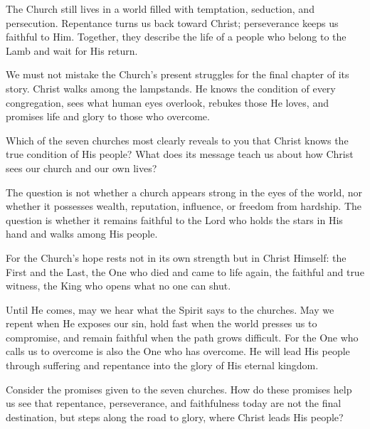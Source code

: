 The Church still lives in a world filled with temptation, seduction, and persecution. Repentance turns us back toward Christ; perseverance keeps us faithful to Him. Together, they describe the life of a people who belong to the Lamb and wait for His return.

We must not mistake the Church's present struggles for the final chapter of its story. Christ walks among the lampstands. He knows the condition of every congregation, sees what human eyes overlook, rebukes those He loves, and promises life and glory to those who overcome.

\begin{ReaderQuestion}
Which of the seven churches most clearly reveals to you that Christ knows the true condition of His people? What does its message teach us about how Christ sees our church and our own lives?
\end{ReaderQuestion}

The question is not whether a church appears strong in the eyes of the world, nor whether it possesses wealth, reputation, influence, or freedom from hardship. The question is whether it remains faithful to the Lord who holds the stars in His hand and walks among His people.

For the Church's hope rests not in its own strength but in Christ Himself: the First and the Last, the One who died and came to life again, the faithful and true witness, the King who opens what no one can shut.

Until He comes, may we hear what the Spirit says to the churches. May we repent when He exposes our sin, hold fast when the world presses us to compromise, and remain faithful when the path grows difficult. For the One who calls us to overcome is also the One who has overcome. He will lead His people through suffering and repentance into the glory of His eternal kingdom.

\begin{ReaderQuestion}
Consider the promises given to the seven churches. How do these promises help us see that repentance, perseverance, and faithfulness today are not the final destination, but steps along the road to glory, where Christ leads His people?
\end{ReaderQuestion}

